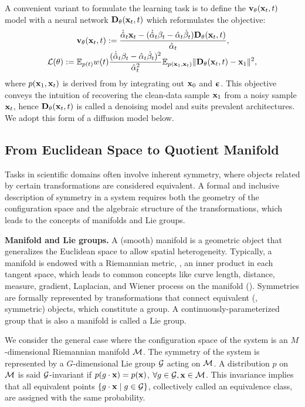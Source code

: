 \documentclass{article} %
\newcommand{\alphahd}{\dot{\alphah}}
\begin{document}
\vspace{-2pt}
A convenient variant to formulate the learning task is to define the $\mathbf{v}_\theta(\mathbf{x}_t,t)$ model with a neural network $\mathbf{D}_\theta(\mathbf{x}_t,t)$ which reformulates the objective:
\begin{align}
  & \bfvv_\theta(\bfxx_t,t) := \frac{\alphahd_t\bfxx_t - (\alphahd_t\beta_t-\alphah_t\betad_t) \bfD_\theta(\bfxx_t,t)}{\alphah_t},
  \label{eqn:v=D} \\[-2pt]
    \label{eqn:objective-D}
    \clL(\theta) :={} & \bbE_{p(t)} w(t)\frac{(\alphahd_t\beta_t-\alphah_t\betad_t)^2}{\alphah_t^2} \bbE_{p(\bfxx_1,\bfxx_t)} \Vert\bfD_\theta(\bfxx_t,t)-\bfxx_1\Vert^2,
\end{align}
where $p(\mathbf{x}_1,\mathbf{x}_t)$ is derived from  by integrating out $\mathbf{x}_0$ and ${\bm{\upepsilon}}$.
This objective conveys the intuition of recovering the clean-data sample $\mathbf{x}_1$ from a noisy sample $\mathbf{x}_t$, hence $\mathbf{D}_\theta(\mathbf{x}_t,t)$ is called a denoising model and suits prevalent architectures.
We adopt this form of a diffusion model below.

\subsection{From Euclidean Space to Quotient Manifold}
Tasks in scientific domains often involve inherent symmetry, where objects related by certain transformations are considered equivalent. 
A formal and inclusive description of symmetry in a system requires both the geometry of the configuration space and the algebraic structure of the transformations, which leads to the concepts of manifolds and Lie groups.

\textbf{Manifold and Lie groups.} A (smooth) manifold is a geometric object that generalizes the Euclidean space to allow spatial heterogeneity. Typically, a manifold is endowed with a Riemannian metric, \ie, an inner product in each tangent space, which leads to common concepts like curve length, distance, measure, gradient, Laplacian, and Wiener process on the manifold ().
Symmetries are formally represented by transformations that connect equivalent (\ie, symmetric) objects, which constitute a group.
A continuously-parameterized group that is also a manifold is called a Lie group.

We consider the general case where the configuration space of the system is an $M$-dimensional Riemannian manifold $\mathcal{M}$.
The symmetry of the system is represented by a $G$-dimensional Lie group $\mathcal{G}$ acting on $\mathcal{M}$. A distribution $p$ on $\mathcal{M}$ is said $\mathcal{G}$-invariant if 
$p(g\cdot\mathbf{x}) = p(\mathbf{x})$, $\forall g\in\mathcal{G},\mathbf{x}\in\mathcal{M}$. This invariance implies that all equivalent points $\{g\cdot \mathbf{x} \mid g\in \mathcal{G}\}$, collectively called an equivalence class, are assigned with the same probability.
\end{document}
